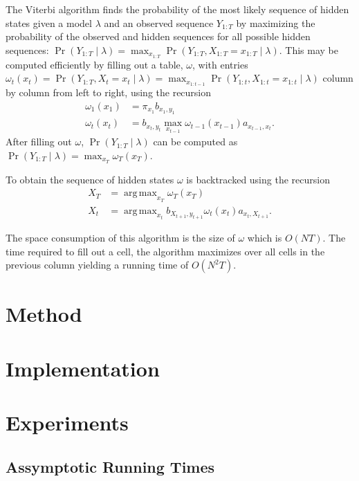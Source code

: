\documentclass[11pt,twoside,a4,danish,english,report]{memoir}
\DeclareMathOperator*{\argmax}{arg\,max}
\begin{document}
The Viterbi algorithm finds the probability of the most likely sequence of
hidden states given a model $\lambda$ and an observed sequence $Y_{1:T}$ by
maximizing the probability of the observed and hidden sequences for all
possible hidden sequences: $\Pr(Y_{1:T} \mid \lambda) = \max_{x_{1:T}}
\Pr(Y_{1:T}, X_{1:T} = x_{1:T} \mid \lambda)$. This may be computed efficiently
by filling out a table, $\omega$, with entries $\omega_t(x_t) = \Pr(Y_{1:T},
X_t = x_t \mid \lambda) = \max_{x_{1:t-1}} \Pr(Y_{1:t}, X_{1:t} = x_{1:t} \mid
\lambda)$ column by column from left to right, using the recursion
\begin{align*}
  \omega_1(x_1) &= \pi_{x_1} b_{x_1, y_1} \\
  \omega_t(x_t) &= b_{x_t, y_t} \max_{x_{t - 1}} \omega_{t - 1}(x_{t - 1})
                  a_{x_{t - 1}, x_t}.
\end{align*}
After filling out $\omega$, $\Pr(Y_{1:T} \mid \lambda)$ can be computed as
$\Pr(Y_{1:T} \mid \lambda) = \max_{x_T} \omega_T(x_T)$.

To obtain the sequence of hidden states $\omega$ is backtracked using the
recursion
\begin{align*}
  X_T &= \argmax_{x_T} \omega_T(x_T) \\
  X_{t} &= \argmax_{x_{t}} b_{X_{t + 1}, y_{t + 1}} \omega_{t}(x_t) a_{x_t, X_{t + 1}}.
\end{align*}

The space consumption of this algorithm is the size of $\omega$ which is $O(N
T)$. The time required to fill out a cell, the algorithm maximizes over all
cells in the previous column yielding a running time of $O(N^2 T)$.
\chapter{Method}
\label{cha:method}

\chapter{Implementation}
\label{cha:implementation}

\chapter{Experiments}
\label{cha:experiments}

\section{Assymptotic Running Times}
\label{sec:assymp-runn-times}
\end{document}
